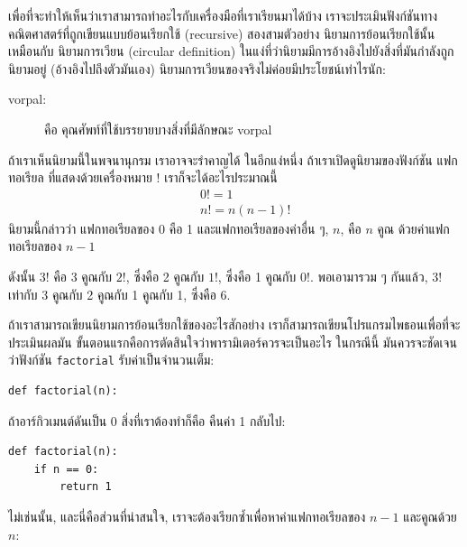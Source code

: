 เพื่อที่จะทำให้เห็นว่าเราสามารถทำอะไรกับเครื่องมือที่เราเรียนมาได้บ้าง เราจะประเมินฟังก์ชันทาง
คณิตศาสตร์ที่ถูกเขียนแบบย้อนเรียกใช้ (recursive) สองสามตัวอย่าง นิยามการย้อนเรียกใช้นั้นเหมือนกับ
นิยามการเวียน (circular definition) ในแง่ที่ว่านิยามมีการอ้างอิงไปยังสิ่งที่มันกำลังถูกนิยามอยู่ 
(อ้างอิงไปถึงตัวมันเอง)  นิยามการเวียนของจริงไม่ค่อยมีประโยชน์เท่าไรนัก:

\begin{description}

\item[vorpal:] คือ คุณศัพท์ที่ใช้บรรยายบางสิ่งที่มีลักษณะ vorpal 

\end{description}

ถ้าเราเห็นนิยามนี้ในพจนานุกรม เราอาจจะรำคาญได้  ในอีกแง่หนึ่ง ถ้าเราเปิดดูนิยามของฟังก์ชัน
แฟกทอเรียล ที่แสดงด้วยเครื่องหมาย {\scriptsize$!$} เราก็จะได้อะไรประมาณนี้
%
\begin{eqnarray*}
&&  0! = 1 \\
&&  n! = n (n-1)!
\end{eqnarray*}
%
นิยามนี้กล่าวว่า แฟกทอเรียลของ 0 คือ 1 และแฟกทอเรียลของค่าอื่น ๆ, {\scriptsize$n$}, คือ {\scriptsize$n$} คูณ
ด้วยค่าแฟกทอเรียลของ {\scriptsize$n-1$}

ดังนั้น {\scriptsize$3!$} คือ 3 คูณกับ {\scriptsize$2!$}, ซึ่งคือ 2 คูณกับ {\scriptsize$1!$}, ซึ่งคือ 1 คูณกับ
{\scriptsize$0!$}. พอเอามารวม ๆ กันแล้ว, {\scriptsize$3!$} เท่ากับ 3 คูณกับ 2 คูณกับ 1 คูณกับ 1,
ซึ่งคือ 6.

ถ้าเราสามารถเขียนนิยามการย้อนเรียกใช้ของอะไรสักอย่าง 
เราก็สามารถเขียนโปรแกรมไพธอนเพื่อที่จะประเมินผลมัน ขั้นตอนแรกคือการตัดสินใจว่าพารามิเตอร์ควรจะเป็นอะไร 
ในกรณีนี้ มันควรจะชัดเจนว่าฟังก์ชัน {\tt factorial} รับค่าเป็นจำนวนเต็ม:

\begin{verbatim}
def factorial(n):
\end{verbatim}
%
ถ้าอาร์กิวเมนต์ดันเป็น 0 สิ่งที่เราต้องทำก็คือ คืนค่า 1 กลับไป:

\begin{verbatim}
def factorial(n):
    if n == 0:
        return 1
\end{verbatim}
%
ไม่เช่นนั้น, และนี่คือส่วนที่น่าสนใจ, เราจะต้องเรียกซ้ำเพื่อหาค่าแฟกทอเรียลของ {\scriptsize$n-1$} 
และคูณด้วย {\scriptsize$n$}:

